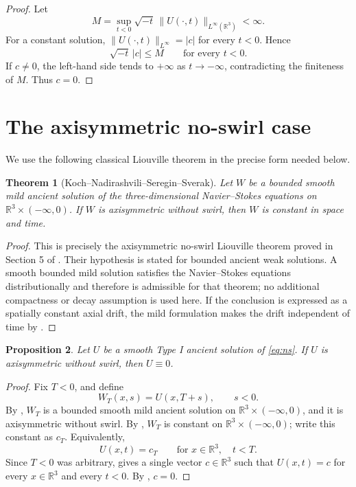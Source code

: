 \documentclass[11pt]{amsart}
\theoremstyle{plain}
\newtheorem{theorem}{Theorem}[section]
\newtheorem{proposition}[theorem]{Proposition}
\theoremstyle{definition}
\theoremstyle{remark}
\numberwithin{equation}{section}
\begin{document}
\begin{proof}
Let
\[
   M=\sup_{t<0}\sqrt{-t}\,
      \|U(\cdot,t)\|_{L^\infty(\mathbb R^3)}<\infty .
\]
For a constant solution, \(\|U(\cdot,t)\|_{L^\infty}=|c|\) for every
\(t<0\).  Hence
\[
   \sqrt{-t}\,|c|\le M\qquad\text{for every }t<0.
\]
If \(c\ne0\), the left-hand side tends to \(+\infty\) as \(t\to-\infty\),
contradicting the finiteness of \(M\).  Thus \(c=0\).
\end{proof}

\section{The axisymmetric no-swirl case}

We use the following classical Liouville theorem in the precise form needed
below.

\begin{theorem}[Koch--Nadirashvili--Seregin--Sverak]\label{thm:knss}
Let \(W\) be a bounded smooth mild ancient solution of the three-dimensional
Navier--Stokes equations on \(\mathbb R^3\times(-\infty,0)\).  If \(W\) is
axisymmetric without swirl, then \(W\) is constant in space and time.
\end{theorem}

\begin{proof}
This is precisely the axisymmetric no-swirl Liouville theorem proved in
Section 5 of \cite{KNSS2009}.  Their hypothesis is stated for bounded ancient
weak solutions.  A smooth bounded mild solution satisfies the
Navier--Stokes equations distributionally and therefore is admissible for that
theorem; no additional compactness or decay assumption is used here.  If the
conclusion is expressed as a spatially constant axial drift, the mild
formulation makes the drift independent of time by
.
\end{proof}

\begin{proposition}\label{prop:no-swirl-type-i}
Let \(U\) be a smooth Type I ancient solution of \eqref{eq:ns}.  If \(U\) is
axisymmetric without swirl, then \(U\equiv0\).
\end{proposition}

\begin{proof}
Fix \(T<0\), and define
\[
W_T(x,s)=U(x,T+s),\qquad s<0.
\]
By , \(W_T\) is a bounded smooth mild ancient solution on
\(\mathbb R^3\times(-\infty,0)\), and it is axisymmetric without swirl.
By , \(W_T\) is constant on
\(\mathbb R^3\times(-\infty,0)\); write this constant as \(c_T\).
Equivalently,
\[
   U(x,t)=c_T\qquad\text{for }x\in\mathbb R^3,\quad t<T.
\]
Since \(T<0\) was arbitrary,  gives a single vector
\(c\in\mathbb R^3\) such that \(U(x,t)=c\) for every \(x\in\mathbb R^3\) and
every \(t<0\).  By , \(c=0\).
\end{proof}
\end{document}
